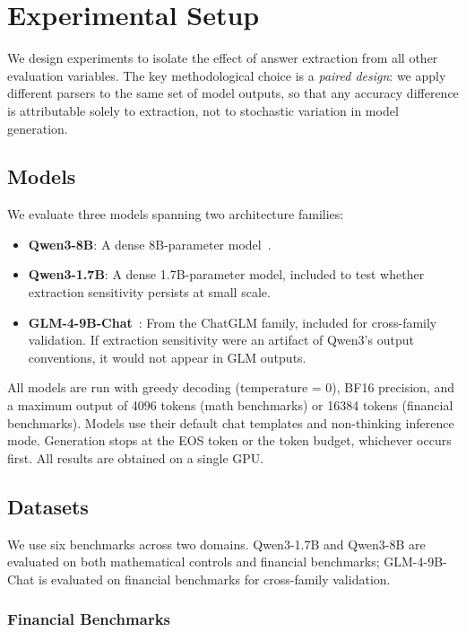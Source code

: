 \section{Experimental Setup}
\label{sec:setup}

We design experiments to isolate the effect of answer extraction from all other evaluation variables. The key methodological choice is a \textit{paired design}: we apply different parsers to the same set of model outputs, so that any accuracy difference is attributable solely to extraction, not to stochastic variation in model generation.

\subsection{Models}
\label{sec:models}

We evaluate three models spanning two architecture families:

\begin{itemize}
    \item \textbf{Qwen3-8B}: A dense 8B-parameter model~\cite{qwen2024}.
    \item \textbf{Qwen3-1.7B}: A dense 1.7B-parameter model, included to test whether extraction sensitivity persists at small scale.
    \item \textbf{GLM-4-9B-Chat}~\cite{glm2024}: From the ChatGLM family, included for cross-family validation. If extraction sensitivity were an artifact of Qwen3's output conventions, it would not appear in GLM outputs.
\end{itemize}

All models are run with greedy decoding (temperature = 0), BF16 precision, and a maximum output of 4096 tokens (math benchmarks) or 16384 tokens (financial benchmarks). Models use their default chat templates and non-thinking inference mode. Generation stops at the EOS token or the token budget, whichever occurs first. All results are obtained on a single GPU.

\subsection{Datasets}
\label{sec:datasets}

We use six benchmarks across two domains. Qwen3-1.7B and Qwen3-8B are evaluated on both mathematical controls and financial benchmarks; GLM-4-9B-Chat is evaluated on financial benchmarks for cross-family validation.

\subsubsection{Financial Benchmarks}

